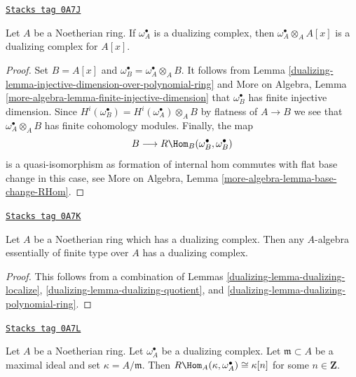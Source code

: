 \begin{lemma}
\label{dualizing-lemma-dualizing-polynomial-ring}
\href{https://stacks.math.columbia.edu/tag/0A7J}{\texttt{Stacks tag 0A7J}}

Let $A$ be a Noetherian ring. If $\omega_A^\bullet$ is a dualizing
complex, then $\omega_A^\bullet \otimes_A A[x]$ is a dualizing
complex for $A[x]$.
\end{lemma}

\begin{proof}

Set $B = A[x]$ and $\omega_B^\bullet = \omega_A^\bullet \otimes_A B$.
It follows from Lemma \ref{dualizing-lemma-injective-dimension-over-polynomial-ring}
and More on Algebra, Lemma \ref{more-algebra-lemma-finite-injective-dimension}
that $\omega_B^\bullet$ has finite injective dimension.
Since $H^i(\omega_B^\bullet) = H^i(\omega_A^\bullet) \otimes_A B$
by flatness of $A \to B$ we see that $\omega_A^\bullet \otimes_A B$
has finite cohomology modules. Finally, the map
$$
B \longrightarrow R\Hom_B(\omega_B^\bullet, \omega_B^\bullet)
$$
is a quasi-isomorphism as formation of internal hom commutes with
flat base change in this case, see
More on Algebra, Lemma \ref{more-algebra-lemma-base-change-RHom}.
\end{proof}

\begin{proposition}
\label{dualizing-proposition-dualizing-essentially-finite-type}
\href{https://stacks.math.columbia.edu/tag/0A7K}{\texttt{Stacks tag 0A7K}}

Let $A$ be a Noetherian ring which has a dualizing complex.
Then any $A$-algebra essentially of finite type over $A$
has a dualizing complex.
\end{proposition}

\begin{proof}

This follows from a combination of
Lemmas \ref{dualizing-lemma-dualizing-localize},
\ref{dualizing-lemma-dualizing-quotient}, and \ref{dualizing-lemma-dualizing-polynomial-ring}.
\end{proof}

\begin{lemma}
\label{dualizing-lemma-find-function}
\href{https://stacks.math.columbia.edu/tag/0A7L}{\texttt{Stacks tag 0A7L}}

Let $A$ be a Noetherian ring. Let $\omega_A^\bullet$ be a dualizing
complex. Let $\mathfrak m \subset A$ be a maximal ideal and set
$\kappa = A/\mathfrak m$. Then
$R\Hom_A(\kappa, \omega_A^\bullet) \cong \kappa[n]$ for some
$n \in \mathbf{Z}$.
\end{lemma}


